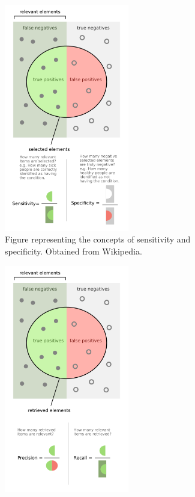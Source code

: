 \begin{figure}[ht]
\centering
\begin{subfigure}[b]{0.48\textwidth}
\centering
\includegraphics[width=0.6\textwidth]{TruePosWikipedia}
\caption{Figure representing the concepts of sensitivity and specificity. Obtained from Wikipedia.}\label{fig:TruePosWikipedia}
\end{subfigure}
\hfill
\begin{subfigure}[b]{0.48\textwidth}
\centering
\includegraphics[width=0.6\textwidth]{PrecisionrecallWikipedia}

\end{subfigure}
\end{figure}
